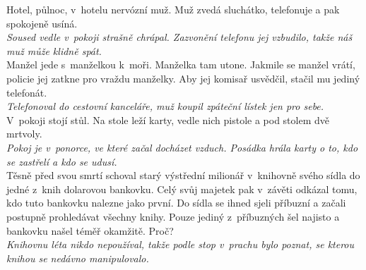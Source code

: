 \begin{multicols}{\value{columnsgames}}
\noindent
Hotel, půlnoc, v~hotelu nervózní muž. Muž zvedá 
sluchátko, telefonuje a pak spokojeně usíná.\\[1 mm]
{\sl Soused vedle v~pokoji strašně chrápal. Zazvonění telefonu 
jej vzbudilo, takže náš muž může klidně spát.}\\

\noindent
Manžel jede s~manželkou k~moři. Manželka tam utone. Jakmile se
manžel vrátí, policie jej zatkne pro vraždu manželky. Aby jej
komisař usvědčil, stačil mu jediný telefonát.\\[1 mm]
{\sl Telefonoval do cestovní kanceláře, muž koupil zpáteční lístek 
jen pro sebe.}\\

\noindent
V~pokoji stojí stůl. Na stole leží karty, vedle 
nich pistole a pod stolem dvě mrtvoly.\\[1 mm]
{\sl Pokoj je v~ponorce, ve které začal docházet vzduch. 
Posádka hrála karty o to, kdo se zastřelí a kdo se udusí.}\\

\noindent
Těsně před svou smrtí schoval starý výstřední milionář v~knihovně svého sídla
do jedné z~knih dolarovou bankovku. Celý svůj majetek pak v~závěti odkázal
tomu, kdo tuto bankovku nalezne jako první. Do sídla se ihned sjeli příbuzní
a začali postupně prohledávat všechny knihy. Pouze jediný z~příbuzných šel
najisto a bankovku našel téměř okamžitě. Proč?\\[1 mm]
{\sl Knihovnu léta nikdo nepoužíval, takže podle stop v~prachu bylo poznat,
se kterou knihou se nedávno manipulovalo.}\\

\end{multicols}
\clearpage

